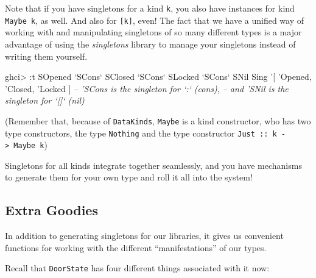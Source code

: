 \documentclass[]{article}
\newenvironment{Shaded}{}{}
\newcommand{\CommentTok}[1]{\textcolor[rgb]{0.38,0.63,0.69}{\textit{#1}}}
\newcommand{\DataTypeTok}[1]{\textcolor[rgb]{0.56,0.13,0.00}{#1}}
\newcommand{\FunctionTok}[1]{\textcolor[rgb]{0.02,0.16,0.49}{#1}}
\newcommand{\NormalTok}[1]{#1}
\newcommand{\OtherTok}[1]{\textcolor[rgb]{0.00,0.44,0.13}{#1}}
\begin{document}
Note that if you have singletons for a kind \texttt{k}, you also have instances
for kind \texttt{Maybe\ k}, as well. And also for \texttt{{[}k{]}}, even! The
fact that we have a unified way of working with and manipulating singletons of
so many different types is a major advantage of using the \emph{singletons}
library to manage your singletons instead of writing them yourself.

\begin{Shaded}
\begin{Highlighting}[]
\NormalTok{ghci}\FunctionTok{>} \FunctionTok{:}\NormalTok{t }\DataTypeTok{SOpened} \OtherTok{`SCons`} \DataTypeTok{SClosed} \OtherTok{`SCons`} \DataTypeTok{SLocked} \OtherTok{`SCons`} \DataTypeTok{SNil}
\DataTypeTok{Sing}\NormalTok{ '[ '}\DataTypeTok{Opened}\NormalTok{, '}\DataTypeTok{Closed}\NormalTok{, '}\DataTypeTok{Locked}\NormalTok{ ]}
\CommentTok{-- 'SCons is the singleton for `:` (cons),}
\CommentTok{-- and 'SNil is the singleton for `[]` (nil)}
\end{Highlighting}
\end{Shaded}

(Remember that, because of \texttt{DataKinds}, \texttt{Maybe} is a kind
constructor, who has two type constructors, the type
\texttt{\textquotesingle{}Nothing} and the type constructor
\texttt{\textquotesingle{}Just\ ::\ k\ -\textgreater{}\ Maybe\ k})

Singletons for all kinds integrate together seamlessly, and you have mechanisms
to generate them for your own type and roll it all into the system!

\hypertarget{extra-goodies}{%
\subsection{Extra Goodies}\label{extra-goodies}}

In addition to generating singletons for our libraries, it gives us convenient
functions for working with the different ``manifestations'' of our types.

Recall that \texttt{DoorState} has four different things associated with it now:
\end{document}
